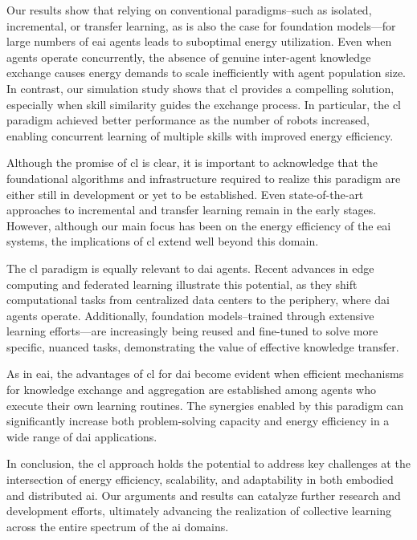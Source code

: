 \documentclass[12pt]{article}
\begin{document}
Our results show that relying on conventional paradigms--such as isolated, incremental, or transfer learning, as is also the case for foundation models---for large numbers of \ac{eai} agents leads to suboptimal energy utilization. Even when agents operate concurrently, the absence of genuine inter-agent knowledge exchange causes energy demands to scale inefficiently with agent population size. In contrast, our simulation study shows that \ac{cl} provides a compelling solution, especially when skill similarity guides the exchange process. In particular, the \ac{cl} paradigm achieved better performance as the number of robots increased, enabling concurrent learning of multiple skills with improved energy efficiency.

Although the promise of \ac{cl} is clear, it is important to acknowledge that the foundational algorithms and infrastructure required to realize this paradigm are either still in development or yet to be established. Even state-of-the-art approaches to incremental and transfer learning remain in the early stages. However, although our main focus has been on the energy efficiency of the \ac{eai} systems, the implications of \ac{cl} extend well beyond this domain.

The \ac{cl} paradigm is equally relevant to \ac{dai} agents. Recent advances in edge computing and federated learning illustrate this potential, as they shift computational tasks from centralized data centers to the periphery, where \ac{dai} agents operate. Additionally, foundation models--trained through extensive learning efforts---are increasingly being reused and fine-tuned to solve more specific, nuanced tasks, demonstrating the value of effective knowledge transfer.

As in \ac{eai}, the advantages of \ac{cl} for \ac{dai} become evident when efficient mechanisms for knowledge exchange and aggregation are established among agents who execute their own learning routines. The synergies enabled by this paradigm can significantly increase both problem-solving capacity and energy efficiency in a wide range of \ac{dai} applications.

In conclusion, the \acl{cl} approach holds the potential to address key challenges at the intersection of energy efficiency, scalability, and adaptability in both embodied and distributed \ac{ai}. Our arguments and results can catalyze further research and development efforts, ultimately advancing the realization of collective learning across the entire spectrum of the \ac{ai} domains.
\end{document}
